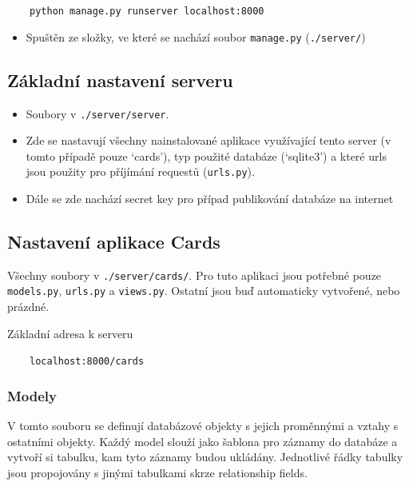 \documentclass[11pt]{article}
\providecommand{\tightlist}{\setlength{\itemsep}{1pt}\setlength{\parskip}{1pt}}
\let\oldtexttt\texttt
\renewcommand{\texttt}[1]{\oldtexttt{\textcolor{codehighlight}{#1}}}
\begin{document}
~~~~\texttt{python\ manage.py\ runserver\ localhost:8000}

\begin{itemize}
\tightlist
\item
  Spuštěn ze složky, ve které se nachází soubor \texttt{manage.py}
  (\texttt{./server/})
\end{itemize}

\hypertarget{zuxe1kladnuxed-nastavenuxed-serveru}{%
\subsection{Základní nastavení
serveru}\label{zuxe1kladnuxed-nastavenuxed-serveru}}

\begin{itemize}
\tightlist
\item
  Soubory v \texttt{./server/server}.
\item
  Zde se nastavují všechny nainstalované aplikace využívající tento
  server (v tomto případě pouze `cards'), typ použité databáze
  (`sqlite3') a které urls jsou použity pro příjímání requestů
  (\texttt{urls.py}).
\item
  Dále se zde nachází secret key pro případ publikování databáze na
  internet
\end{itemize}

\hypertarget{nastavenuxed-aplikace-cards}{%
\subsection{Nastavení aplikace
Cards}\label{nastavenuxed-aplikace-cards}}

Všechny soubory v \texttt{./server/cards/}. Pro tuto aplikaci jsou
potřebné pouze \texttt{models.py}, \texttt{urls.py} a \texttt{views.py}.
Ostatní jsou buď automaticky vytvořené, nebo prázdné.

Základní adresa k serveru

~~~~\texttt{localhost:8000/cards}

\hypertarget{modely}{%
\subsubsection{Modely}\label{modely}}

V tomto souboru se definují databázové objekty s jejich proměnnými a
vztahy s ostatními objekty. Každý model slouží jako šablona pro záznamy
do databáze a vytvoří si tabulku, kam tyto záznamy budou ukládány.
Jednotlivé řádky tabulky jsou propojovány s jinými tabulkami skrze
relationship fields.
\end{document}

